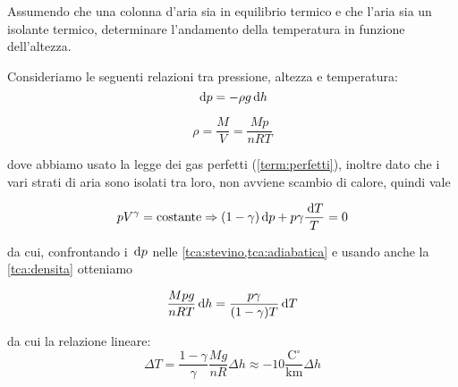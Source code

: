 \documentclass[../main.tex]{subfiles}
\begin{document}

\textex

Assumendo che una colonna d'aria sia in equilibrio termico e che l'aria sia un isolante termico,
determinare l'andamento della temperatura in funzione dell'altezza.

\solution

Consideriamo le seguenti relazioni tra pressione, altezza e temperatura:
\begin{equation}
	\label{tca:stevino}
	\,\mathrm{d} p = -\rho g \,\mathrm{d} h
\end{equation}

\begin{equation}
	\label{tca:densita}
	\rho = \frac{M}{V} = \frac{Mp}{nRT}
\end{equation}

dove abbiamo usato la legge dei gas perfetti (\cref{term:perfetti}), inoltre dato che i vari strati di aria sono isolati tra loro, non avviene scambio
di calore, quindi vale

\begin{equation}
	\label{tca:adiabatica}
	pV^{\gamma} = \text{costante} \Rightarrow (1-\gamma)\,\mathrm{d} p+p\gamma\frac{\,\mathrm{d} T}{T} = 0
\end{equation}

da cui, confrontando i $\,\mathrm{d} p$ nelle \cref{tca:stevino,tca:adiabatica} e usando anche la \cref{tca:densita}  otteniamo

\[
	\frac{Mpg}{nRT}\,\mathrm{d} h = \frac{p\gamma}{(1-\gamma)T}\,\mathrm{d} T
\]

da cui la relazione lineare:
\begin{equation}
	\label{tca:andamento}
	\Delta T = \frac{1-\gamma}{\gamma}\frac{Mg}{nR}\Delta h \approx -10 \frac {\text{C}^{\circ}}{\text{km}} \Delta h
\end{equation}
\end{document}
